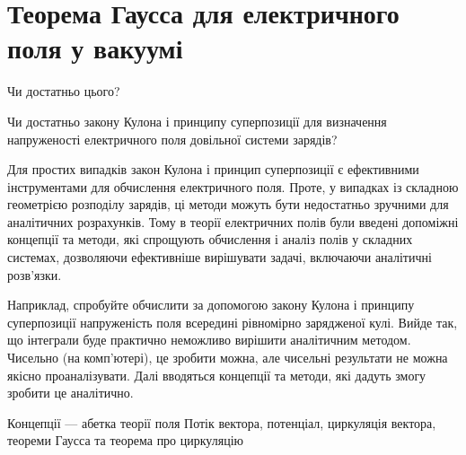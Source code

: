 \documentclass{beamer}
\begin{document}
\section{Теорема Гаусса для електричного поля у вакуумі}
\begin{frame}{Чи достатньо цього?}{}
	\begin{alertblock}{}\centering
		Чи достатньо закону Кулона і принципу суперпозиції для визначення
		напруженості електричного поля довільної системи зарядів?
	\end{alertblock}
	\begin{block}{}\justifying
		Для простих випадків \alert{закон Кулона} і \alert{принцип
			суперпозиції} є ефективними \alert{інструментами для обчислення
			електричного поля}. Проте, у випадках із складною геометрією розподілу
		зарядів, ці методи можуть бути недостатньо зручними для аналітичних
		розрахунків. Тому в теорії електричних полів були \alert{введені
			допоміжні концепції та методи}, які \alert{спрощують обчислення і
			аналіз} полів у складних системах, дозволяючи ефективніше вирішувати
		задачі, включаючи аналітичні розв’язки.
	\end{block}

	\begin{exampleblock}{}\justifying\small
		Наприклад, спробуйте обчислити за допомогою закону Кулона і принципу
		суперпозиції напруженість поля всередині рівномірно зарядженої кулі. Вийде
		так, що інтеграли буде практично неможливо вирішити аналітичним методом.
		Чисельно (на комп'ютері), це зробити можна, але чисельні результати не
		можна якісно проаналізувати. Далі вводяться концепції та методи, які
		дадуть змогу зробити це аналітично.
	\end{exampleblock}

	\begin{alertblock}{Концепції --- абетка теорії поля}\justifying
		Потік вектора, потенціал, циркуляція вектора, теореми Гаусса та теорема
		про циркуляцію
	\end{alertblock}
\end{frame}
\end{document}
